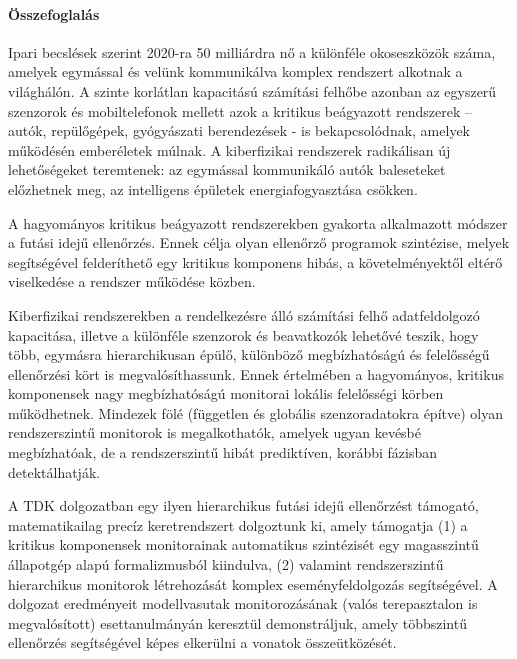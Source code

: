 
\thispagestyle{plain}
\paragraph*{Összefoglalás}

Ipari becslések szerint 2020-ra 50 milliárdra nő a különféle okoseszközök száma, amelyek egymással és velünk kommunikálva komplex rendszert alkotnak a világhálón. A szinte korlátlan kapacitású számítási felhőbe azonban az egyszerű szenzorok és mobiltelefonok mellett azok a kritikus beágyazott rendszerek – autók, repülőgépek, gyógyászati berendezések - is bekapcsolódnak, amelyek működésén emberéletek múlnak. A kiberfizikai rendszerek radikálisan új lehetőségeket teremtenek: az egymással kommunikáló autók baleseteket előzhetnek meg, az intelligens épületek energiafogyasztása csökken.

A hagyományos kritikus beágyazott rendszerekben gyakorta alkalmazott módszer a futási idejű ellenőrzés. Ennek célja olyan ellenőrző programok szintézise, melyek segítségével felderíthető egy kritikus komponens hibás, a követelményektől eltérő viselkedése a rendszer működése közben.

Kiberfizikai rendszerekben a rendelkezésre álló számítási felhő adatfeldolgozó kapacitása, illetve a különféle szenzorok és beavatkozók lehetővé teszik, hogy több, egymásra hierarchikusan épülő, különböző megbízhatóságú és felelősségű ellenőrzési kört is megvalósíthassunk. Ennek értelmében a hagyományos, kritikus komponensek nagy megbízhatóságú monitorai lokális felelősségi körben működhetnek. Mindezek fölé (független és globális szenzoradatokra építve) olyan rendszerszintű monitorok is megalkothatók, amelyek ugyan kevésbé megbízhatóak, de a rendszerszintű hibát prediktíven, korábbi fázisban detektálhatják.

A TDK dolgozatban egy ilyen hierarchikus futási idejű ellenőrzést támogató, matematikailag precíz keretrendszert dolgoztunk ki, amely támogatja (1) a kritikus komponensek monitorainak automatikus szintézisét egy magasszintű állapotgép alapú formalizmusból kiindulva, (2) valamint rendszerszintű hierarchikus monitorok létrehozását komplex eseményfeldolgozás segítségével. A dolgozat eredményeit modellvasutak monitorozásának (valós terepasztalon is megvalósított) esettanulmányán keresztül demonstráljuk, amely többszintű ellenőrzés segítségével képes elkerülni a vonatok összeütközését.

\newpage

